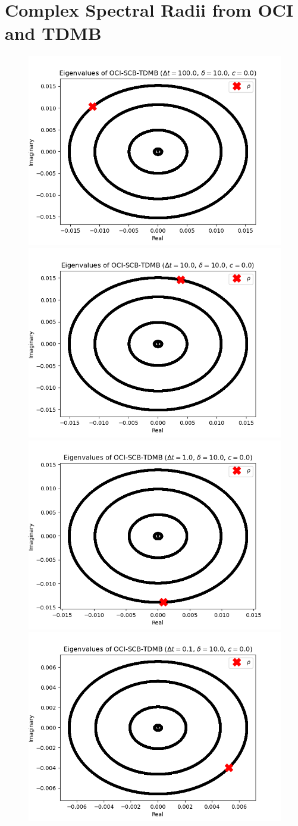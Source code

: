 

\chapter{Complex Spectral Radii from OCI and TDMB}
\label{chap:spec_rads}


\begin{figure}
    \centering
    \includegraphics[width=.24\textwidth]{appendix/eig_plots/c0/mfp10.0dt100.0c0.0.png}
    \includegraphics[width=.24\textwidth]{appendix/eig_plots/c0/mfp10.0dt10.0c0.0.png}
    \includegraphics[width=.24\textwidth]{appendix/eig_plots/c0/mfp10.0dt1.0c0.0.png}
    \includegraphics[width=.24\textwidth]{appendix/eig_plots/c0/mfp10.0dt0.1c0.0.png}


\end{figure}
